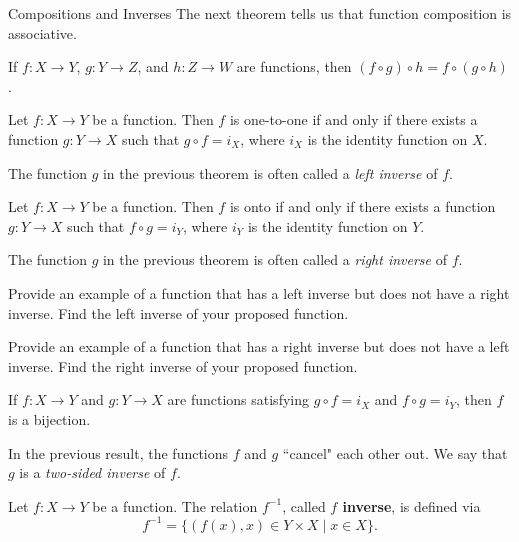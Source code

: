 \begin{section}{Compositions and Inverses}
The next theorem tells us that function composition is associative.

\begin{theorem}
If $f:X\to Y$, $g:Y\to Z$, and $h:Z\to W$ are functions, then $(f\circ g)\circ h = f\circ (g\circ h)$.
\end{theorem}

\begin{theorem}
Let $f:X\to Y$ be a function. Then $f$ is one-to-one if and only if there exists a function $g:Y\to X$ such that $g\circ f=i_X$, where $i_X$ is the identity function on $X$.
\end{theorem}

The function $g$ in the previous theorem is often called a \emph{left inverse} of $f$.

\begin{theorem}
Let $f:X\to Y$ be a function. Then $f$ is onto if and only if there exists a function $g:Y\to X$ such that $f\circ g=i_Y$, where $i_Y$ is the identity function on $Y$.
\end{theorem}

The function $g$ in the previous theorem is often called a \emph{right inverse} of $f$.

\begin{exercise}
Provide an example of a function that has a left inverse but does not have a right inverse. Find the left inverse of your proposed function.
\end{exercise}

\begin{exercise}
Provide an example of a function that has a right inverse but does not have a left inverse. Find the right inverse of your proposed function.
\end{exercise}

\begin{corollary}\label{cor:two-sided inverse}
If $f:X\to Y$ and $g:Y\to X$ are functions satisfying $g\circ f=i_X$ and  $f\circ g=i_Y$, then $f$ is a bijection.
\end{corollary}

In the previous result, the functions $f$ and $g$ ``cancel" each other out. We say that $g$ is a \emph{two-sided inverse} of $f$.

\begin{definition}
Let $f:X\to Y$ be a function.  The relation $f^{-1}$, called \textbf{$f$ inverse}, is defined via
\[
f^{-1}=\{(f(x),x)\in Y\times X\mid x\in X\}.
\]
\end{definition}


\end{section}
